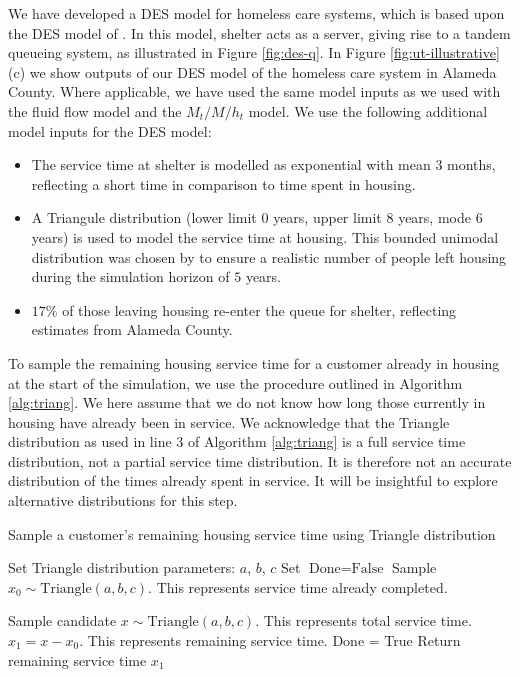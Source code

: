 \documentclass[12pt,a4paper]{article}
\begin{document}
We have developed a DES model for homeless care systems, which is based upon the DES model of \cite{singham2023discrete}. In this model, shelter acts as a server, giving rise to a tandem queueing system, as illustrated in Figure \ref{fig:des-q}. In Figure \ref{fig:ut-illustrative}(c) we show outputs of our DES model of the homeless care system in Alameda County. Where applicable, we have used the same model inputs as we used with the fluid flow model and the $M_t/M/h_t$ model. We use the following additional model inputs for the DES model:
%
\begin{itemize} [noitemsep]
\item The service time at shelter is modelled as exponential with mean $3$ months, reflecting a short time in comparison to time spent in housing.
\item A Triangule distribution (lower limit $0$ years, upper limit $8$ years, mode $6$ years) is used to model the service time at housing. This bounded unimodal distribution was chosen by \cite{singham2023discrete} to ensure a realistic number of people left housing during the simulation horizon of $5$ years. 
\item $17\%$ of those leaving housing re-enter the queue for shelter, reflecting estimates from Alameda County.
\end{itemize}
%
To sample the remaining housing service time for a customer already in housing at the start of the simulation, we use the procedure outlined in Algorithm \ref{alg:triang}. We here assume that we do not know how long those currently in housing have already been in service. We acknowledge that the Triangle distribution as used in line $3$ of Algorithm \ref{alg:triang} is a full service time distribution, not a partial service time distribution. It is therefore not an accurate distribution of the times already spent in service. It will be insightful to explore alternative distributions for this step.

\begin{algorithm}
\caption{Sample a customer's remaining housing service time using Triangle distribution}\label{alg:triang}
\begin{algorithmic}[1]

  \State Set Triangle distribution parameters: $a$, $b$, $c$
  \State Set $\text{Done} = \text{False}$
\State Sample $x_0 \sim \text{Triangle}(a,b,c)$. This represents service time already completed.

 \State Sample candidate $x \sim \text{Triangle}(a,b,c)$. This represents total service time.
 \State $x_1 = x - x_0$. This represents remaining service time.
 \State  Done = True
 \EndIf
 \EndWhile
\State Return remaining service time $x_1$
    
\end{algorithmic}
\end{algorithm}
\end{document}
